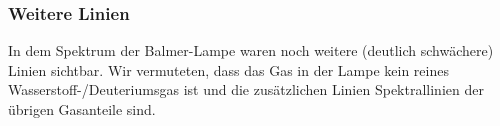 \subsubsection{Weitere Linien}
In dem Spektrum der Balmer-Lampe waren noch weitere (deutlich schwächere) Linien sichtbar. Wir vermuteten, dass das Gas in der Lampe kein reines Wasserstoff-/Deuteriumsgas ist und die zusätzlichen Linien Spektrallinien der übrigen Gasanteile sind.
